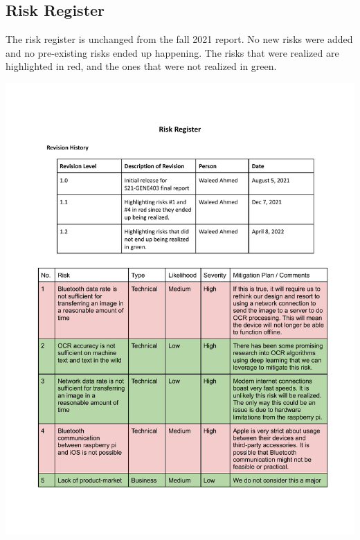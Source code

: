 \documentclass[a4paper,11pt]{article}
\begin{document}
\subsection{Risk Register}
The risk register is unchanged from the fall 2021 report. No new risks were added and no pre-existing risks ended up happening. The risks that were realized are highlighted in red, and the ones that were not realized in green.
\begin{center}
    \includegraphics[page=1,width={1.0\linewidth}]{pdf/risk_register.pdf}
    \newpage

\end{center}
\end{document}
